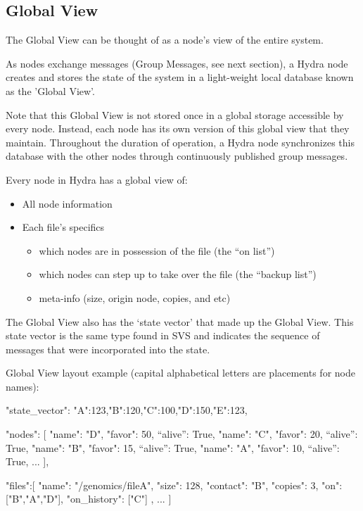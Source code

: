 \subsection{Global View} \label{sec:global-view}
The Global View can be thought of as %
a node's view of the entire system.

As nodes exchange messages (Group Messages, see next section), a Hydra node creates and stores the state of the system in a light-weight local database known as the 'Global View'. 


Note that this Global View is not stored once in a global storage accessible by every node. Instead, each node has its own version of this global view that they maintain. Throughout the duration of operation, a Hydra node synchronizes this database with the other nodes through continuously published group messages.


Every node in Hydra has a global view of:
\begin{itemize}
    \item All node information
    \item Each file’s specifics
    \begin{itemize}
        \item which nodes are in possession of the file (the “on list”)
        \item which nodes can step up to take over the file (the “backup list”)
        \item meta-info (size, origin node, copies, and etc)
    \end{itemize}
\end{itemize}

The Global View also has the ‘state vector’ that made up the Global View. This state vector is the same type found in SVS and indicates the sequence of messages that were incorporated into the state.

Global View layout example (capital alphabetical letters are placements for node names):
{\small
\begin{spverbatim}{
"state_vector": {"A":123,"B":120,"C":100,"D":150,"E":123},

"nodes": [
    {"name": "D", "favor": 50, “alive”: True},
    {"name": "C", "favor": 20, “alive”: True},
    {"name": "B", "favor": 15, “alive”: True},
    {"name": "A", "favor": 10, “alive”: True},
    ...
    ],

"files":[
    {
        "name": "/genomics/fileA",
        "size": 128,
        "contact": "B",
        "copies": 3,
        "on": ["B","A","D"],
        "on_history": ["C"]
    },
    ...
    ]
}\end{spverbatim}
}